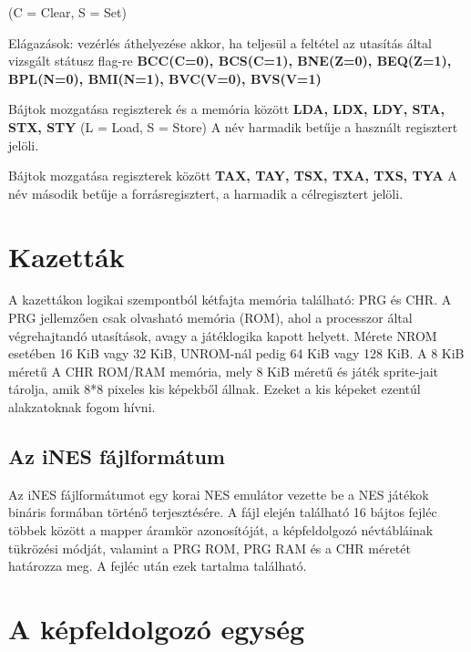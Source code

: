 \begin{compactdesc}
	\newline
	(C = Clear, S = Set)
	\item Elágazások: vezérlés áthelyezése akkor, ha teljesül a feltétel az utasítás által vizsgált státusz flag-re
	\newline \textbf{BCC(C=0), BCS(C=1), BNE(Z=0), BEQ(Z=1), BPL(N=0), BMI(N=1),  BVC(V=0), BVS(V=1)}
	\item Bájtok mozgatása regiszterek és a memória között
	\newline
	\textbf{LDA, LDX, LDY, STA, STX, STY} 
	\newline
	(L = Load, S = Store)
	\newline
	A név harmadik betűje a használt regisztert jelöli.
	\item Bájtok mozgatása regiszterek között
	\newline
	\textbf{TAX, TAY, TSX, TXA, TXS, TYA}
	\newline
	A név második betűje a forrásregisztert, a harmadik a célregisztert jelöli.
\end{compactdesc}

\section{Kazetták}

A kazettákon logikai szempontból kétfajta memória található: PRG és CHR.
A PRG jellemzően csak olvasható memória (ROM), ahol a processzor által végrehajtandó utasítások, avagy a játéklogika kapott helyett. Mérete NROM esetében 16 KiB vagy 32 KiB, UNROM-nál pedig 64 KiB vagy 128 KiB. A 8 KiB méretű A CHR ROM/RAM memória, mely 8 KiB méretű és játék sprite-jait tárolja, amik 8*8 pixeles kis képekből állnak. Ezeket a kis képeket ezentúl alakzatoknak fogom hívni. 

\subsection{Az iNES fájlformátum}

Az iNES fájlformátumot egy korai NES emulátor vezette be a NES játékok bináris formában történő terjesztésére. A fájl elején található 16 bájtos fejléc többek között a mapper áramkör azonosítóját, a képfeldolgozó névtábláinak tükrözési módját, valamint a PRG ROM, PRG RAM és a CHR méretét határozza meg. A fejléc után ezek tartalma található.

\section{A képfeldolgozó egység}

